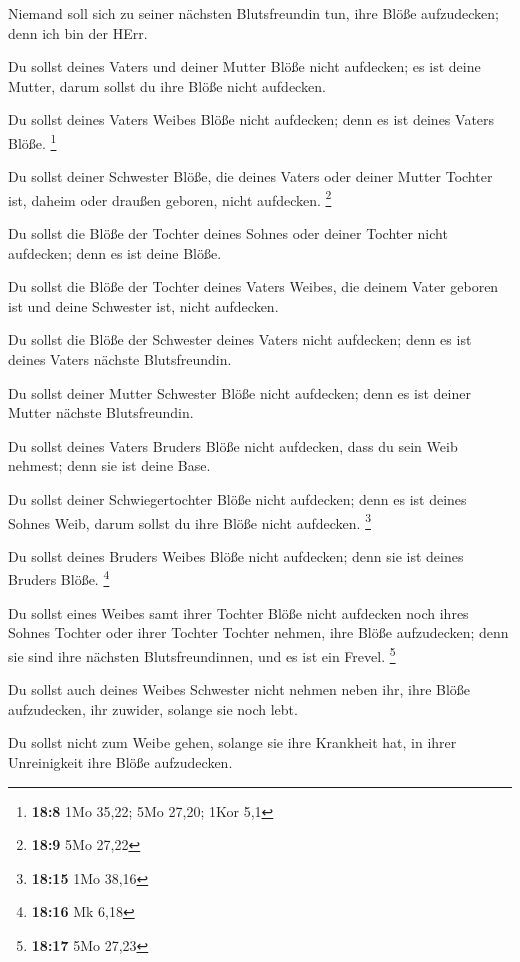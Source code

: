  Niemand soll sich zu seiner nächsten Blutsfreundin tun,
ihre Blöße aufzudecken; denn ich bin der HErr.

 Du sollst deines Vaters und deiner Mutter Blöße nicht
aufdecken; es ist deine Mutter, darum sollst du ihre Blöße nicht
aufdecken.

 Du sollst deines Vaters Weibes Blöße nicht aufdecken; denn
es ist deines Vaters Blöße. \footnote{\textbf{18:8} 1Mo 35,22; 5Mo
  27,20; 1Kor 5,1}

 Du sollst deiner Schwester Blöße, die deines Vaters oder
deiner Mutter Tochter ist, daheim oder draußen geboren, nicht aufdecken.
\footnote{\textbf{18:9} 5Mo 27,22}

 Du sollst die Blöße der Tochter deines Sohnes oder deiner
Tochter nicht aufdecken; denn es ist deine Blöße.

 Du sollst die Blöße der Tochter deines Vaters Weibes, die
deinem Vater geboren ist und deine Schwester ist, nicht aufdecken.

 Du sollst die Blöße der Schwester deines Vaters nicht
aufdecken; denn es ist deines Vaters nächste Blutsfreundin.

 Du sollst deiner Mutter Schwester Blöße nicht aufdecken;
denn es ist deiner Mutter nächste Blutsfreundin.

 Du sollst deines Vaters Bruders Blöße nicht aufdecken,
dass du sein Weib nehmest; denn sie ist deine Base.

 Du sollst deiner Schwiegertochter Blöße nicht aufdecken;
denn es ist deines Sohnes Weib, darum sollst du ihre Blöße nicht
aufdecken. \footnote{\textbf{18:15} 1Mo 38,16}

 Du sollst deines Bruders Weibes Blöße nicht aufdecken;
denn sie ist deines Bruders Blöße. \footnote{\textbf{18:16} Mk 6,18}

 Du sollst eines Weibes samt ihrer Tochter Blöße nicht
aufdecken noch ihres Sohnes Tochter oder ihrer Tochter Tochter nehmen,
ihre Blöße aufzudecken; denn sie sind ihre nächsten Blutsfreundinnen,
und es ist ein Frevel. \footnote{\textbf{18:17} 5Mo 27,23}

 Du sollst auch deines Weibes Schwester nicht nehmen neben
ihr, ihre Blöße aufzudecken, ihr zuwider, solange sie noch lebt.

 Du sollst nicht zum Weibe gehen, solange sie ihre
Krankheit hat, in ihrer Unreinigkeit ihre Blöße aufzudecken.

